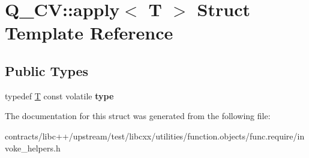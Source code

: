 \hypertarget{struct_q___c_v_1_1apply}{}\section{Q\+\_\+\+CV\+:\+:apply$<$ T $>$ Struct Template Reference}
\label{struct_q___c_v_1_1apply}
\subsection*{Public Types}
\begin{DoxyCompactItemize}
\item 
\mbox{\label{struct_q___c_v_1_1apply_abc16c3532dd8004d3148f3fa301aa3b1}} 
typedef \mbox{\hyperlink{struct_t}{T}} const volatile {\bfseries type}
\end{DoxyCompactItemize}


The documentation for this struct was generated from the following file\+:\begin{DoxyCompactItemize}
\item 
contracts/libc++/upstream/test/libcxx/utilities/function.\+objects/func.\+require/invoke\+\_\+helpers.\+h\end{DoxyCompactItemize}
